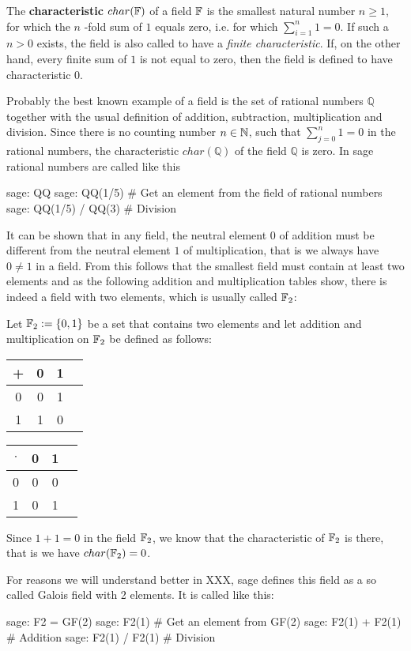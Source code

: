 The \textbf{characteristic} $char(\mathbb{F})$ of a field $ \mathbb{F} $ is the smallest natural number $ n \geq 1 $, for which the $ n $ -fold sum of $ 1 $ equals zero, i.e. for which $ \sum_{i = 1} ^ n 1 = 0 $. If such a $ n> 0 $ exists, the field is also called to have a \textit{finite characteristic}. If, on the other hand, every finite sum of $1$ is not equal to zero, then the field is defined to have characteristic $ 0 $.
\begin{example} Probably the best known example of a field is the set of rational numbers $\mathbb{Q}$ together with the usual definition of addition, subtraction, multiplication and division. Since there is no counting number $n\in \mathbb{N}$, such that $\sum_{j=0}^n 1 =0$ in the rational numbers, the characteristic $char(\mathbb{Q})$ of the field $\mathbb{Q}$ is zero. In sage rational numbers are called like this
\begin{sagecommandline}
sage: QQ
sage: QQ(1/5) # Get an element from the field of rational numbers
sage: QQ(1/5) / QQ(3) # Division
\end{sagecommandline}
\end{example}
\begin{example} It can be shown that in any field, the neutral element $0$ of addition must be different from the neutral element $1$ of multiplication, that is we always have $0\neq 1$ in a field. From this follows that the smallest field must contain at least two elements and as the following addition and multiplication tables show, there is indeed a field with two elements, which is usually called $\mathbb{F}_2$:

Let $\mathbb{F}_2:=\{0,1 \}$ be a set that contains two elements and let addition and multiplication on $\mathbb{F}_2$ be defined as follows:
\begin{center}
  \begin{tabular}{c | c c c}
    + & 0 & 1 \\\hline
    0 & 0 & 1\\
    1 & 1 & 0 \\
  \end{tabular} \quad \quad \quad \quad
  \begin{tabular}{c | c c c}
$\cdot$ & 0 & 1 \\\hline
      0 & 0 & 0 \\
      1 & 0 & 1 \\
  \end{tabular}
\end{center}
Since $1+1=0$ in the field $\mathbb{F}_2$, we know that the characteristic of $\mathbb{F}_2$ is there, that is we have $char(\mathbb{F}_2)=0$.

For reasons we will understand better in XXX, sage defines this field as a so called Galois field with 2 elements. It is called like this:
\begin{sagecommandline}
sage: F2 = GF(2)
sage: F2(1) # Get an element from GF(2)
sage: F2(1) + F2(1) # Addition
sage: F2(1) / F2(1) # Division
\end{sagecommandline}
\end{example}

